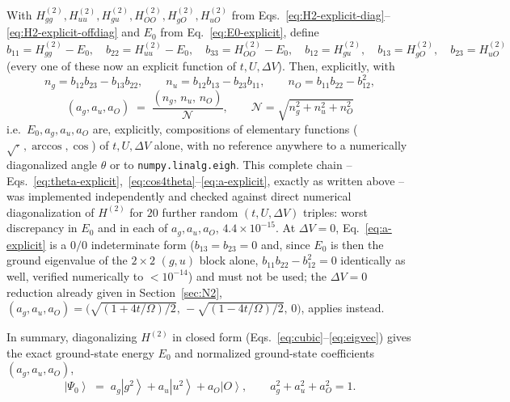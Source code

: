 \documentclass[11pt]{article}
\newcommand{\ket}[1]{\left|#1\right\rangle}
\begin{document}
With $H^{(2)}_{gg},H^{(2)}_{uu},H^{(2)}_{gu},H^{(2)}_{OO},H^{(2)}_{gO},H^{(2)}_{uO}$ from
Eqs.~\eqref{eq:H2-explicit-diag}--\eqref{eq:H2-explicit-offdiag} and $E_0$ from
Eq.~\eqref{eq:E0-explicit}, define
\begin{equation}
  b_{11}=H^{(2)}_{gg}-E_0,\quad b_{22}=H^{(2)}_{uu}-E_0,\quad b_{33}=H^{(2)}_{OO}-E_0,\quad
  b_{12}=H^{(2)}_{gu},\quad b_{13}=H^{(2)}_{gO},\quad b_{23}=H^{(2)}_{uO}
  \label{eq:b-explicit}
\end{equation}
(every one of these now an explicit function of $t,U,\Delta V$). Then, explicitly, with
\begin{equation}
  n_g = b_{12}b_{23}-b_{13}b_{22},\qquad
  n_u = b_{12}b_{13}-b_{23}b_{11},\qquad
  n_O = b_{11}b_{22}-b_{12}^{2},
  \label{eq:a-explicit-num}
\end{equation}
\begin{equation}
  \boxed{\;
  (a_g,a_u,a_O) \;=\; \frac{(n_g,\,n_u,\,n_O)}{\mathcal N},
  \qquad
  \mathcal N=\sqrt{n_g^2+n_u^2+n_O^2}
  \;}
  \label{eq:a-explicit}
\end{equation}
i.e.\ $E_0,a_g,a_u,a_O$ are, explicitly, compositions of elementary functions
($\sqrt{\cdot}\,,\arccos,\cos$) of $t,U,\Delta V$ alone, with no reference anywhere to a
numerically diagonalized angle $\theta$ or to \texttt{numpy.linalg.eigh}. This complete
chain -- Eqs.~\eqref{eq:theta-explicit},~\eqref{eq:cos4theta}--\eqref{eq:a-explicit}, exactly
as written above -- was implemented independently and checked against direct numerical
diagonalization of $H^{(2)}$ for $20$ further random $(t,U,\Delta V)$ triples: worst
discrepancy in $E_0$ and in each of $a_g,a_u,a_O$, $4.4\times10^{-15}$. At $\Delta V=0$,
Eq.~\eqref{eq:a-explicit} is a $0/0$ indeterminate form ($b_{13}=b_{23}=0$ and, since $E_0$ is
then the ground eigenvalue of the $2\times2$ $(g,u)$ block alone, $b_{11}b_{22}-b_{12}^2=0$
identically as well, verified numerically to $<10^{-14}$) and must not be used; the $\Delta
V=0$ reduction already given in Section~\ref{sec:N2}, $(a_g,a_u,a_O)=\bigl(\sqrt{(1+4t/\Omega)/2},\,
-\sqrt{(1-4t/\Omega)/2},\,0\bigr)$, applies instead.

In summary, diagonalizing $H^{(2)}$ in closed form (Eqs.~\eqref{eq:cubic}--\eqref{eq:eigvec})
gives the exact ground-state energy $E_0$ and normalized ground-state coefficients
$(a_g,a_u,a_O)$,
\begin{equation}
  \ket{\Psi_0} \;=\; a_g\ket{g^2}+a_u\ket{u^2}+a_O\ket{O},
  \qquad a_g^2+a_u^2+a_O^2=1.
  \label{eq:psi0}
\end{equation}
\end{document}
